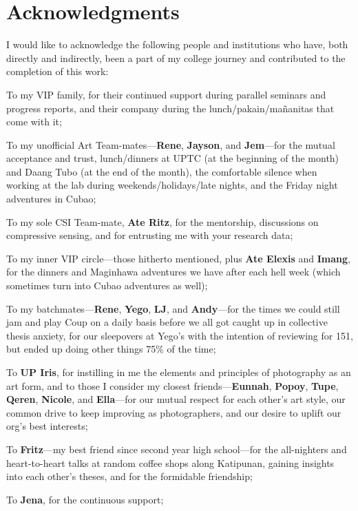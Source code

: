 \chapter*{Acknowledgments}

I would like to acknowledge the following people and institutions who have, both directly and indirectly, been a part of my college journey and contributed to the completion of this work:

To my VIP family, for their continued support during parallel seminars and progress reports, and their company during the lunch/pakain/ma\~{n}anitas that come with it;

To my unofficial Art Team-mates---\textbf{Rene}, \textbf{Jayson}, and \textbf{Jem}---for the mutual acceptance and trust, lunch/dinners at UPTC (at the beginning of the month) and Daang Tubo (at the end of the month), the comfortable silence when working at the lab during weekends/holidays/late nights, and the Friday night adventures in Cubao;

To my sole CSI Team-mate, \textbf{Ate Ritz}, for the mentorship, discussions on compressive sensing, and for entrusting me with your research data;

To my inner VIP circle---those hitherto mentioned, plus \textbf{Ate Elexis} and \textbf{Imang}, for the dinners and Maginhawa adventures we have after each hell week (which sometimes turn into Cubao adventures as well);

To my batchmates---\textbf{Rene}, \textbf{Yego}, \textbf{LJ}, and \textbf{Andy}---for the times we could still jam and play Coup on a daily basis before we all got caught up in collective thesis anxiety, for our sleepovers at Yego's with the intention of reviewing for 151, but ended up doing other things 75\% of the time;

To \textbf{UP Iris}, for instilling in me the elements and principles of photography as an art form, and to those I consider my closest friends---\textbf{Eunnah}, \textbf{Popoy}, \textbf{Tupe}, \textbf{Qeren}, \textbf{Nicole}, and \textbf{Ella}---for our mutual respect for each other's art style, our common drive to keep improving as photographers, and our desire to uplift our org's best interests;

To \textbf{Fritz}---my best friend since second year high school---for the all-nighters and heart-to-heart talks at random coffee shops along Katipunan, gaining insights into each other's theses, and for the formidable friendship;

To \textbf{Jena}, for the continuous support;

